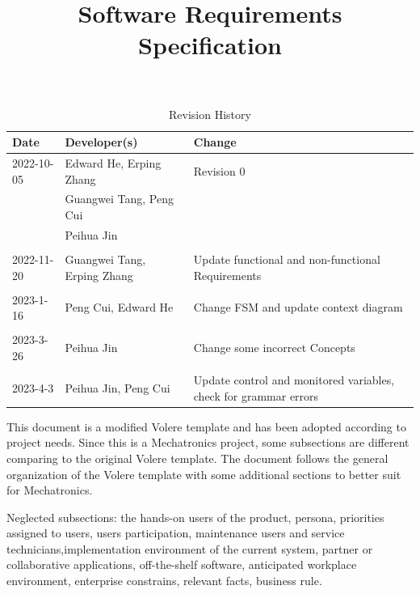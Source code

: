 \documentclass[12pt]{article}
\title{Software Requirements Specification\\\progname}
\author{\authname}
\date{}
\begin{document}
\maketitle

\newpage
\begin{table}[hp]
\caption{Revision History} \label{TblRevisionHistory}
\begin{tabularx}{\textwidth}{llX}
\toprule
\textbf{Date} & \textbf{Developer(s)} & \textbf{Change}\\
\midrule
2022-10-05 & Edward He, Erping Zhang & Revision 0\\
& Guangwei Tang, Peng Cui & \\
& Peihua Jin & \\\\
2022-11-20 & Guangwei Tang, Erping Zhang & Update functional and non-functional Requirements\\\\
2023-1-16 & Peng Cui, Edward He & Change FSM and update context diagram\\\\
2023-3-26 & Peihua Jin & Change some incorrect Concepts\\\\
2023-4-3 & Peihua Jin, Peng Cui & Update control and monitored variables, check for grammar errors\\
\bottomrule
\end{tabularx}
\end{table}

This document is a modified Volere template and has been adopted according to project needs. Since this is a Mechatronics project, some subsections are different comparing to the original Volere template. The document follows the general organization of the Volere template with some additional sections to better suit for Mechatronics. 

Neglected subsections: the hands-on users of the product, persona, priorities assigned to users, users participation, maintenance users and service technicians,implementation environment of the current system, partner or collaborative applications, off-the-shelf software, anticipated workplace environment, enterprise constrains, relevant facts, business rule.
\newpage


\tableofcontents

\newpage



\listoftables
\listoffigures

\newpage
\end{document}
